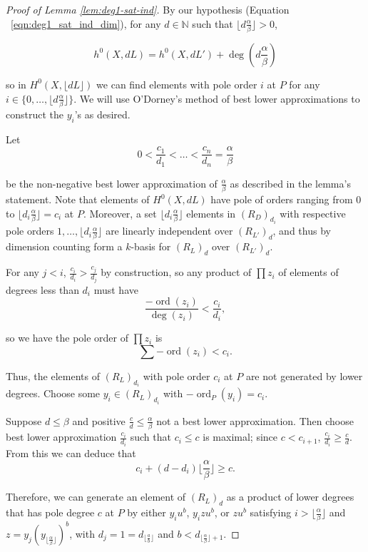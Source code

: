 \documentclass{amsart}
\theoremstyle{plain}
\theoremstyle{definition}
\theoremstyle{remark}
\numberwithin{equation}{section}
\DeclareMathOperator{\ord}{ord}
\newcommand \halfcan{L}
\begin{document}
\begin{proof}[Proof of Lemma \ref{lem:deg1-sat-ind}]
By
our hypothesis (Equation ~\ref{eqn:deg1_sat_ind_dim}), for any $d
\in \mathbb{N}$ such that $\lfloor d \frac{ \alpha}{\beta} \rfloor > 0$,

\[
	h^0 (X, d \halfcan ) = h^0(X, d\halfcan') + \deg(d\frac{\alpha}{\beta})
\]

\noindent
so in $H^0 (X, \lfloor d\halfcan \rfloor)$ we can find elements with pole
order $i$ at $P$ for any $i \in \{0, \ldots, \lfloor d \frac{\alpha}{
\beta} \rfloor \}$. We will use O'Dorney's method of best lower approximations to
construct the $y_i$'s as desired. 

Let 
\[
	0 < \frac{c_1}{d_1} < \ldots < \frac{c_n}{d_n} = \frac{\alpha}{
	\beta}
\]

\noindent
be the non-negative best lower approximation of $\frac{
\alpha}{\beta}$ as described in the lemma's statement.  Note that elements of $H^0(X, d\halfcan)$ have pole of
orders ranging from 0 to $\lfloor d_i \frac{\alpha}{\beta}\rfloor =
c_i $ at $P$.  Moreover, a set $\lfloor d_i \frac{\alpha}{\beta}\rfloor$ elements in $(R_{D})_{d_i}$ with respective pole orders $1, \ldots, \lfloor
d_i \frac{\alpha}{\beta} \rfloor$ are linearly independent over $(R_{\halfcan'})_d$, and thus by dimension counting form a $k$-basis for
$(R_{\halfcan})_d$ over $(R_{\halfcan'})_d$.

For any $j < i$, $\frac{c_i}{d_i} > \frac{c_j}{d_j}$
by construction, so any product of $\prod z_i$ of elements of
degrees less than $d_i$ must have
\[
	\frac{-\ord(z_i)}{\deg(z_i)} < \frac{c_i}{d _i},
\]

\noindent
so we have the pole order of $\prod z_i$ is 
\[
	\sum -\ord(z_i) < c_i .
\]

\noindent
Thus, the elements of $(R_{\halfcan})_{d_i}$ with pole order $c_i$ at $P$ are not generated by 
lower degrees. 
Choose some $y_i \in(R_{
\halfcan})_{d_i}$ with $-\ord_{P}(y_i)=c_i$.

Suppose $d\le \beta$ and positive $\frac{c}{d} \le \frac{\alpha}{
\beta}$ not a best lower approximation. Then choose
best lower approximation $\frac{c_i}{d_i}$ such that $c_i\le c$ is
maximal; since $c<c_{i + 1}$, $\frac{c_i}{d_i}\ge \frac{c}{d}$. From
this we can deduce that 
\[
	c_i +(d-d_i) \lfloor \frac{\alpha}{\beta} \rfloor \ge c.
\]

\noindent
Therefore, we can generate an element of $(R_{\halfcan})_d$ as a product of lower degrees that 
has pole degree $c$ at $P$ by either $y_i u^b$, $y_i z u^b$, or $zu^b$ satisfying $i>
\lfloor \frac{\alpha}{\beta} \rfloor$ and $z=y_j (y_{\lfloor \frac{\alpha}{\beta} \rfloor})^b$, 
with $d_j = 1 =d_{{\lfloor \frac{a}{b} \rfloor}}$ and $b<d_{\lfloor \frac{\alpha}{\beta} 
\rfloor + 1}$.


\end{proof}
\end{document}
